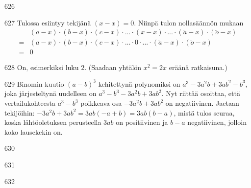\begin{Vastaus}{626}
    
\end{Vastaus}
\begin{Vastaus}{627}
        Tulossa esiintyy tekijänä $(x-x)=0$. Niinpä tulon nollasäännön mukaan
        \begin{align*}
            &(a-x)\cdot(b-x)\cdot(c-x)\cdot...\cdot(x-x)\cdot...\cdot(\ddot{a}-x)\cdot(\ddot{o}-x) \\
            =&(a-x)\cdot(b-x)\cdot(c-x)\cdot...\cdot 0\cdot...\cdot(\ddot{a}-x)\cdot(\ddot{o}-x) \\
            =&0
        \end{align*}
    
\end{Vastaus}
\begin{Vastaus}{628}
On, esimerkiksi luku $2$. (Saadaan yhtälön $x^2=2x$ eräänä ratkaisuna.)
	
\end{Vastaus}
\begin{Vastaus}{629}
	Binomin kuutio $(a-b)^3$ kehitettynä polynomiksi on $a^3-3a^2b+3ab^2-b^3$, joka järjesteltynä uudelleen on $a^3-b^3-3a^2b+3ab^2$. Nyt riittää osoittaa, että vertailukohteesta $a^3-b^3$ poikkeava osa $-3a^2b+3ab^2$ on negatiivinen. Jaetaan tekijöihin: $-3a^2b+3ab^2=3ab(-a+b)=3ab(b-a)$, mistä tulos seuraa, koska lähtöoletuksen perusteella $3ab$ on positiivinen ja $b-a$ negatiivinen, jolloin koko lausekekin on.
	
\end{Vastaus}
\begin{Vastaus}{630}
    
\end{Vastaus}
\begin{Vastaus}{631}
    
\end{Vastaus}
\begin{Vastaus}{632}
    
\end{Vastaus}
